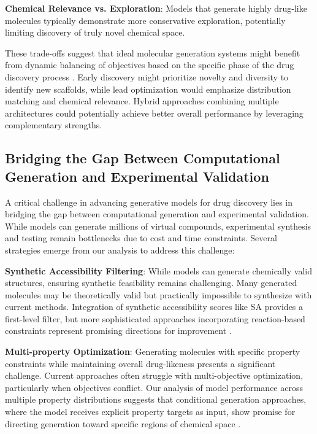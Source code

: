 \documentclass[conference]{IEEEtran}
\begin{document}
\textbf{Chemical Relevance vs. Exploration}: Models that generate highly drug-like molecules typically demonstrate more conservative exploration, potentially limiting discovery of truly novel chemical space.

These trade-offs suggest that ideal molecular generation systems might benefit from dynamic balancing of objectives based on the specific phase of the drug discovery process \cite{Coley2020}. Early discovery might prioritize novelty and diversity to identify new scaffolds, while lead optimization would emphasize distribution matching and chemical relevance. Hybrid approaches combining multiple architectures could potentially achieve better overall performance by leveraging complementary strengths.

\subsection{Bridging the Gap Between Computational Generation and Experimental Validation}
A critical challenge in advancing generative models for drug discovery lies in bridging the gap between computational generation and experimental validation. While models can generate millions of virtual compounds, experimental synthesis and testing remain bottlenecks due to cost and time constraints. Several strategies emerge from our analysis to address this challenge:

\textbf{Synthetic Accessibility Filtering}: While models can generate chemically valid structures, ensuring synthetic feasibility remains challenging. Many generated molecules may be theoretically valid but practically impossible to synthesize with current methods. Integration of synthetic accessibility scores like SA \cite{Ertl2009} provides a first-level filter, but more sophisticated approaches incorporating reaction-based constraints represent promising directions for improvement \cite{Coley2020}.

\textbf{Multi-property Optimization}: Generating molecules with specific property constraints while maintaining overall drug-likeness presents a significant challenge. Current approaches often struggle with multi-objective optimization, particularly when objectives conflict. Our analysis of model performance across multiple property distributions suggests that conditional generation approaches, where the model receives explicit property targets as input, show promise for directing generation toward specific regions of chemical space \cite{Xu2021}.
\end{document}
